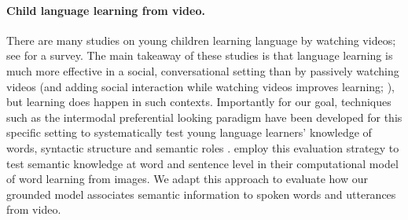 \paragraph{Child language learning from video.}
There are many studies on young children learning language by watching
videos; see \cite{vanderplank2010deja} for a survey. The main takeaway
of these studies is that language learning is much more effective in a
social, conversational setting than by passively watching videos
\cite{kuhl2003foreign,anderson2005television,robb2009just} (and adding
social interaction while watching videos improves learning;
\citet{lytle2018two}), but learning does happen in such
contexts. Importantly for our goal, techniques such as the intermodal
preferential looking paradigm have been developed for this specific
setting to systematically test young language learners' knowledge of
words, syntactic structure and semantic roles
\cite{hirsh1996intermodal,bergelson20126,noble2011comprehension}.
\citet{nikolaus-fourtassi-2021-evaluating}
employ this evaluation strategy to test semantic knowledge at word and
sentence level in their computational model of word learning from
images. We adapt this approach to evaluate how our grounded model
associates semantic information to spoken words and utterances from
video.
 
 





